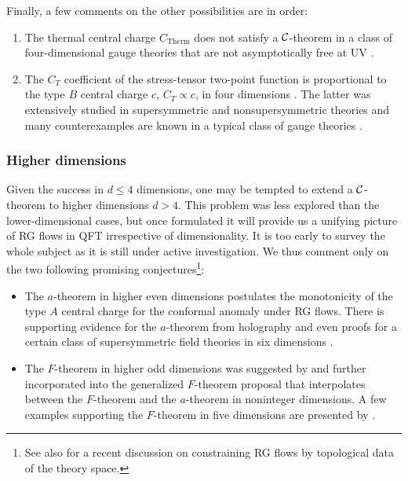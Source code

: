 Finally, a few comments on the other possibilities are in order:
\begin{enumerate}
\item[$(a)$] The thermal central charge $C_\text{Therm}$ does not satisfy a ${\cal C}$-theorem in a class of four-dimensional gauge theories that are not asymptotically free at UV \cite{Appelquist:1999hr}.
\item[$(b,c)$] The $C_T$ coefficient of the stress-tensor two-point function is proportional to the type $B$ central charge $c$, $C_T \propto c$, in four dimensions \cite{Osborn:1993cr}.
The latter was extensively studied in supersymmetric and nonsupersymmetric theories and many counterexamples are known in a typical class of gauge theories  \cite{Cappelli:1990yc,Anselmi:1997am}.
\end{enumerate}


\subsubsection{Higher dimensions}
Given the success in $d\le 4$ dimensions, one may be tempted to extend a ${\cal C}$-theorem to higher dimensions $d>4$.
This problem was less explored than the lower-dimensional cases, but once formulated it will provide us a unifying picture of RG flows in QFT irrespective of dimensionality.
It is too early to survey the whole subject as it is still under active investigation.
We thus comment only on the two following promising conjectures\footnote{See also \textcite{Gukov:2015qea,Gukov:2016tnp} for a recent discussion on  constraining RG flows by topological data of the theory space.
}:
\begin{itemize}
\item The $a$-theorem in higher even dimensions postulates the monotonicity of the type $A$ central charge for the conformal anomaly under RG flows.
There is supporting evidence for the $a$-theorem from holography \cite{Myers:2010xs,Myers:2010tj} and even proofs for a certain class of supersymmetric field theories in six dimensions \cite{Cordova:2015fha,Cordova:2015vwa}.
\item The $F$-theorem in higher odd dimensions was suggested by \textcite{Klebanov:2011gs,Myers:2010xs,Myers:2010tj} and further incorporated into the generalized $F$-theorem proposal \cite{Giombi:2014xxa} that interpolates between the $F$-theorem and the $a$-theorem in noninteger dimensions.
A few examples supporting the $F$-theorem in five dimensions are presented by \textcite{Jafferis:2012iv,Fei:2014yja}.
\end{itemize}


